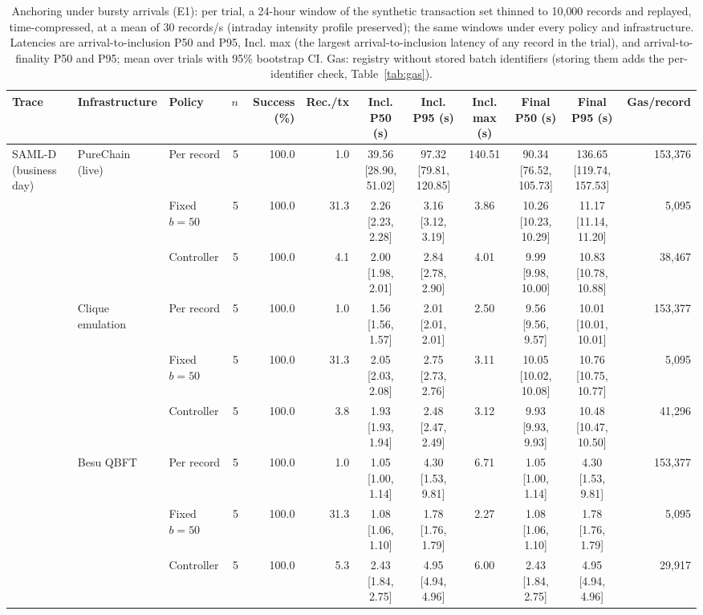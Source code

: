 \begin{table}[t]
\centering
\scriptsize
\caption{Anchoring under bursty arrivals (E1): per trial, a 24-hour window of the synthetic transaction set thinned to 10{,}000 records and replayed, time-compressed, at a mean of 30 records/s (intraday intensity profile preserved); the same windows under every policy and infrastructure. Latencies are arrival-to-inclusion P50 and P95, Incl. max (the largest arrival-to-inclusion latency of any record in the trial), and arrival-to-finality P50 and P95; mean over trials with 95\% bootstrap CI. Gas: registry without stored batch identifiers (storing them adds the per-identifier check, Table~\ref{tab:gas}).}
\label{tab:e11}
\begin{adjustbox}{max width=\textwidth}
\begin{tabular}{lllrrrcccccr}
\toprule
Trace & Infrastructure & Policy & $n$ & Success (\%) & Rec./tx & Incl. P50 (s) & Incl. P95 (s) & Incl. max (s) & Final P50 (s) & Final P95 (s) & Gas/record \\
\midrule
SAML-D (business day) & PureChain (live) & Per record & 5 & 100.0 & 1.0 & 39.56 [28.90, 51.02] & 97.32 [79.81, 120.85] & 140.51 & 90.34 [76.52, 105.73] & 136.65 [119.74, 157.53] & 153,376 \\
 &  & Fixed $b{=}50$ & 5 & 100.0 & 31.3 & 2.26 [2.23, 2.28] & 3.16 [3.12, 3.19] & 3.86 & 10.26 [10.23, 10.29] & 11.17 [11.14, 11.20] & 5,095 \\
 &  & Controller & 5 & 100.0 & 4.1 & 2.00 [1.98, 2.01] & 2.84 [2.78, 2.90] & 4.01 & 9.99 [9.98, 10.00] & 10.83 [10.78, 10.88] & 38,467 \\
 & Clique emulation & Per record & 5 & 100.0 & 1.0 & 1.56 [1.56, 1.57] & 2.01 [2.01, 2.01] & 2.50 & 9.56 [9.56, 9.57] & 10.01 [10.01, 10.01] & 153,377 \\
 &  & Fixed $b{=}50$ & 5 & 100.0 & 31.3 & 2.05 [2.03, 2.08] & 2.75 [2.73, 2.76] & 3.11 & 10.05 [10.02, 10.08] & 10.76 [10.75, 10.77] & 5,095 \\
 &  & Controller & 5 & 100.0 & 3.8 & 1.93 [1.93, 1.94] & 2.48 [2.47, 2.49] & 3.12 & 9.93 [9.93, 9.93] & 10.48 [10.47, 10.50] & 41,296 \\
 & Besu QBFT & Per record & 5 & 100.0 & 1.0 & 1.05 [1.00, 1.14] & 4.30 [1.53, 9.81] & 6.71 & 1.05 [1.00, 1.14] & 4.30 [1.53, 9.81] & 153,377 \\
 &  & Fixed $b{=}50$ & 5 & 100.0 & 31.3 & 1.08 [1.06, 1.10] & 1.78 [1.76, 1.79] & 2.27 & 1.08 [1.06, 1.10] & 1.78 [1.76, 1.79] & 5,095 \\
 &  & Controller & 5 & 100.0 & 5.3 & 2.43 [1.84, 2.75] & 4.95 [4.94, 4.96] & 6.00 & 2.43 [1.84, 2.75] & 4.95 [4.94, 4.96] & 29,917 \\

\end{tabular}
\end{adjustbox}
\end{table}

